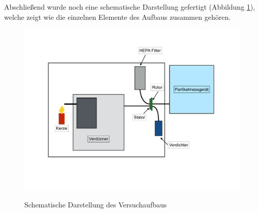 Abschlie{\ss}end wurde noch eine schematische Darstellung gefertigt (Abbildung \ref{fig:scheme}), welche zeigt wie die einzelnen Elemente des Aufbaus zusammen geh\"{o}ren.
\begin{figure}[H]
        \myfloatalign
        {\includegraphics[width=.9\linewidth]{gfx/conclusion/aufbau.pdf}} \quad
        \caption[Schematische Darstellung des Versuchaufbaus]
        {Schematische Darstellung des Versuchaufbaus}
        \label{fig:scheme}
\end{figure}

